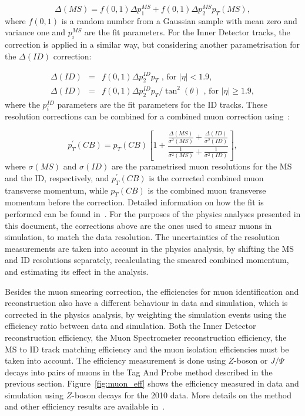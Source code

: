 \begin{equation}
\displaystyle
\Delta (MS) = f(0, 1) \Delta p_1^{MS} + f(0, 1) \Delta p_2^{MS} p_T (MS),
\label{eq:muon_dms}
\end{equation}
where $f(0, 1)$ is a random number from a Gaussian sample with mean zero and variance one and $p_i^{MS}$ are the fit parameters.
For the Inner Detector tracks, the correction is applied in a similar way, but considering another parametrisation for the $\Delta (ID)$ correction:

\begin{eqnarray}
\displaystyle
\Delta (ID)&=&f(0, 1) \Delta p_2^{ID} p_T \textrm{ , for $|\eta| <1.9$,} \nonumber \\
\Delta (ID)&=&f(0, 1) \Delta p_2^{ID} p_T / \tan^2(\theta) \textrm{ , for $|\eta| \geq 1.9$},
\label{eq:muon_did}
\end{eqnarray}
where the $p_i^{ID}$ parameters are the fit parameters for the ID tracks.
These resolution corrections can be combined for a combined muon correction using~\cite{muonres2010}:

\begin{equation}
\displaystyle
p_T^{\prime}(CB) = p_T(CB) \left[ 1 + \frac{\frac{\Delta(MS)}{\sigma^2(MS)} + \frac{\Delta(ID)}{\sigma^2(ID)} }{\frac{1}{\sigma^2(MS)} + \frac{1}{\sigma^2(ID)}} \right],
\label{eq:muon_res_combined}
\end{equation}
where $\sigma(MS)$ and $\sigma(ID)$ are the parametrised muon resolutions for the MS and the ID, respectively, and $p_T^{\prime}(CB)$ is the corrected
combined muon transverse momentum, while $p_T(CB)$ is the combined muon transverse momentum before the correction. Detailed information on
how the fit is performed can be found in~\cite{muonres2010}. For the purposes of the physics analyses presented in this document, the corrections above are
the ones used to smear muons in simulation, to match the data resolution. The uncertainties of the resolution measurements are taken into account in the physics
analysis, by shifting the MS and ID resolutions separately, recalculating the smeared combined momentum, and estimating its effect
in the analysis.

Besides the muon smearing correction, the efficiencies for muon identification and reconstruction also have a different behaviour in data and simulation, which is corrected
in the physics analysis, by weighting the simulation events using the efficiency ratio between data and simulation. Both the Inner Detector reconstruction efficiency,
the Muon Spectrometer reconstruction efficiency, the MS to ID track matching efficiency and the muon isolation efficiencies must be taken into account. The efficiency
measurement is done using $Z$-boson or $J/\Psi$ decays into pairs of muons in the Tag And Probe method described in the previous section.
Figure~\ref{fig:muon_eff} shows the efficiency measured in data and simulation using $Z$-boson decays for the 2010 data. More details on the method and other
efficiency results are available in~\cite{muonperf2010}.

